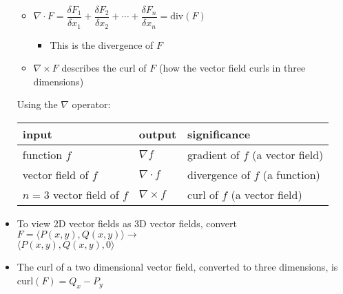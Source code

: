 \begin{itemize}
\begin{itemize}
      \item $\nabla \cdot F = \dfrac{\delta F_1}{\delta x_1} + \dfrac{\delta F_2}{\delta x_2} + \cdots + \dfrac{\delta F_n}{\delta x_n} = \text{div}(F)$

        \begin{itemize}

          \item This is the divergence of $F$

        \end{itemize}

      \item $\nabla \times F$ describes the curl of $F$ (how the vector field curls in three dimensions)

    \end{itemize}

    \begin{center}
      Using the $\nabla$ operator:\\
      \begin{tabular}{| l | l | l |}
        \hline
        input & output & significance\\
        \hline
        function $f$ & $\nabla f$ & gradient of $f$ (a vector field)\\
        \hline
        vector field of $f$ & $\nabla\cdot f$ & divergence of $f$ (a function)\\
        \hline
        $n=3$ vector field of $f$ & $\nabla\times f$ & curl of $f$ (a vector field)\\
        \hline
      \end{tabular}
    \end{center}

  \item To view 2D vector fields as 3D vector fields, convert $F=\langle P(x,y), Q(x,y)\rangle\to$\\$\langle P(x,y), Q(x,y), 0 \rangle$

  \item The curl of a two dimensional vector field, converted to three dimensions, is curl$(F) = Q_x-P_y$

\end{itemize}



